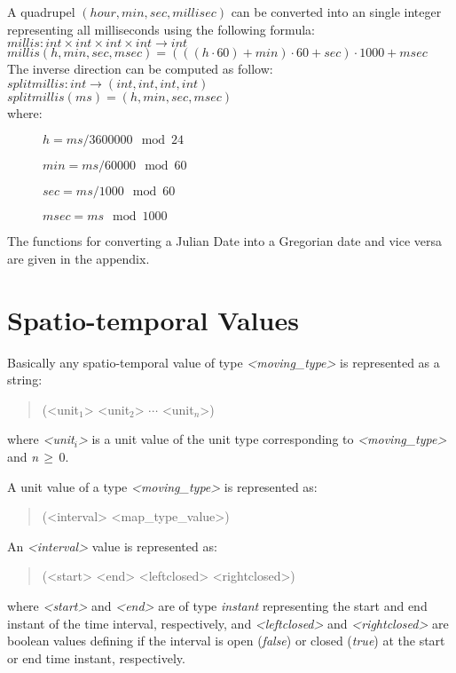 \documentclass[english,a4paper]{article}
\begin{document}
A quadrupel $(hour, min , sec, millisec)$ can be converted into
an single integer representing all milliseconds using the following formula:\\
$ millis : int \times int \times int \times int \rightarrow int $\\
$ millis(h,min,sec,msec) = (((h\cdot 60) + min)\cdot 60 + sec)\cdot 1000+ msec $
\\[1em]
The inverse direction can be computed as follow:\\
$ splitmillis: int \rightarrow (int,int,int,int)$ \\
$ splitmillis(ms) = (h,min,sec,msec)$ \\
where:
\begin{description}
   \item[] $ h =   {ms}/{3600000} \mod 24 $
   \item[] $ min = {ms}/{60000} \mod 60$
   \item[] $ sec = {ms}/{1000} \mod 60$
   \item[] $ msec = ms \mod 1000 $
\end{description}


The functions for converting a Julian Date into a Gregorian date and vice versa are
given in the appendix.

\section{Spatio-temporal Values}

Basically any spatio-temporal value of type \emph{<moving\_type>}
is represented as a string:

\begin{quotation}
(<unit$_{1}$> <unit$_{2}$> $\cdots $ <unit$_{n}$>)
\end{quotation}
where \emph{<unit$_{i}$>} is a unit value of the unit type corresponding
to \emph{<moving\_type>} and \emph{n}$\, \geq \, $0.

A unit value of a type \emph{<moving\_type>} is represented as:

\begin{quotation}
(<interval> <map\_type\_value>)
\end{quotation}

An \emph{<interval>} value is represented as:

\begin{quotation}
(<start> <end> <leftclosed> <rightclosed>)
\end{quotation}
where \emph{<start>} and \emph{<end>} are of type \emph{instant}
representing the start and end instant of the time interval, respectively, and
\emph{<leftclosed>} and \emph{<rightclosed>} are boolean values defining
if the interval is open (\emph{false}) or closed (\emph{true}) at
the start or end time instant, respectively.
\end{document}
